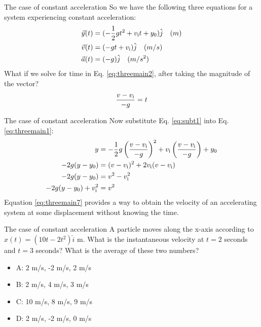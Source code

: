 \documentclass{beamer}
\begin{document}
\begin{frame}{The case of constant acceleration}
So we have the following three equations for a system experiencing constant acceleration:
\begin{align}
\vec{y}(t) &= (-\frac{1}{2}gt^2+v_{\rm i}t+y_{\rm 0}) \hat{j} \quad (m) \label{eq:threemain1} \\
\vec{v}(t) &= (-gt + v_{\rm i}) \hat{j} \quad (m/s) \label{eq:threemain2} \\
\vec{a}(t) &= (-g) \hat{j} \quad (m/s^2) \label{eq:threemain3}
\end{align}
What if we solve for time in Eq. \ref{eq:threemain2}, after taking the magnitude of the vector? \\
\begin{equation}
\frac{v-v_{\rm i}}{-g} = t
\label{eq:subt1}
\end{equation}
\end{frame}

\begin{frame}{The case of constant acceleration}
Now substitute Eq. \ref{eq:subt1} into Eq. \ref{eq:threemain1}:\\
\begin{align}
y &= -\frac{1}{2}g\left(\frac{v-v_{\rm i}}{-g}\right)^2+v_{\rm i}\left(\frac{v-v_{\rm i}}{-g}\right)+y_{\rm 0} \label{eq:threemain4} \\ 
-2g(y-y_{\rm 0}) &= (v-v_{\rm i})^2 + 2v_{\rm i}(v-v_{\rm i}) \label{eq:threemain5} \\
-2g(y-y_{\rm 0}) &= v^2-v_{\rm i}^2 \label{eq:threemain6} \\
-2g(y-y_{\rm 0})+v_{\rm i}^2 &= v^2 \label{eq:threemain7}
\end{align}
Equation \ref{eq:threemain7} provides a way to obtain the velocity of an accelerating system at some displacement without knowing the time.
\end{frame}

\begin{frame}{The case of constant acceleration}
A particle moves along the x-axis according to $x(t) = (10t-2t^2)\hat{i}$ m.  What is the instantaneous velocity
at $t=2$ seconds and $t=3$ seconds? What is the average of these two numbers?
\begin{itemize}
\item A: 2 m/s, -2 m/s, 2 m/s
\item B: 2 m/s, 4 m/s, 3 m/s
\item C: 10 m/s, 8 m/s, 9 m/s
\item D: 2 m/s, -2 m/s, 0 m/s
\end{itemize}
\end{frame}
\end{document}
